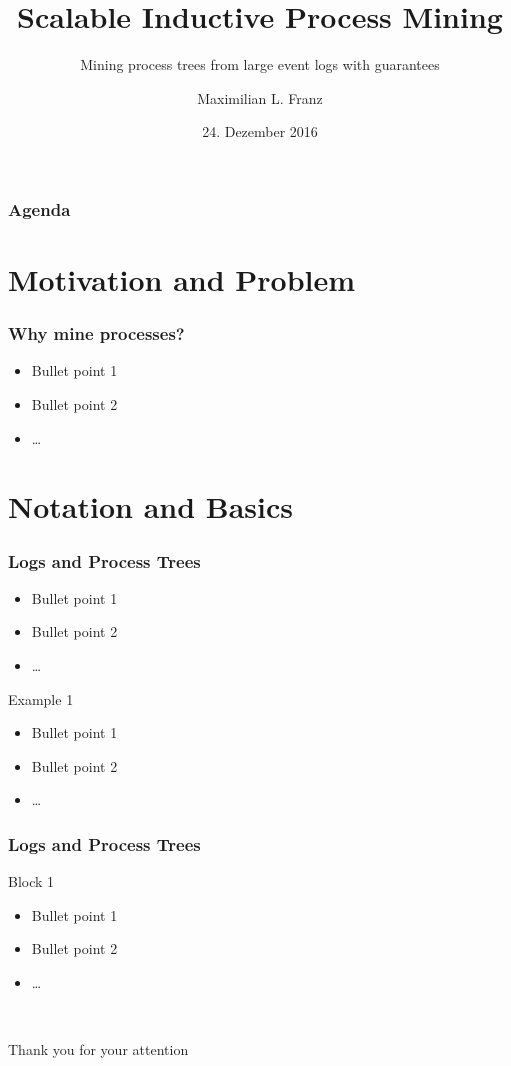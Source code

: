 \documentclass[18pt]{beamer}
\institute{Proseminar Anthropomatik: Von der Theorie zur Anwendung}
\title[Scalable Inductive Process Mining]{Scalable Inductive Process Mining}
\subtitle{Mining process trees from large event logs with guarantees}
\author{Maximilian L. Franz}
\date{24. Dezember 2016}
\begin{document}
\begin{frame}
    \titlepage
\end{frame}

\begin{frame}
    \frametitle{Agenda}
    \tableofcontents
\end{frame}

\section{Motivation and Problem} %
\label{sec:}
\begin{frame}
    \frametitle{Why mine processes?}    
    \begin{itemize}
	\item Bullet point 1
	\pause
	\item Bullet point 2
	\item \dots
\end{itemize}
\end{frame}


\section{Notation and Basics} %
\label{sec:notation_and_basics}
\begin{frame}
    \frametitle{Logs and Process Trees}    
    \begin{itemize}
	\item Bullet point 1
	\pause
	\item Bullet point 2
	\item \dots
\end{itemize}
\begin{exampleblock}{Example 1}
\begin{itemize}
\item Bullet point 1
\pause
\item Bullet point 2
\item \dots
\end{itemize}
\end{exampleblock}
\end{frame}

\begin{frame}
    \frametitle{Logs and Process Trees} 
\begin{block}{Block 1}
\begin{itemize}
\item Bullet point 1
\pause
\item Bullet point 2
\item \dots
\end{itemize}
\end{block}
\end{frame}


\begin{frame}{~}
	\begin{center}
		\huge{Thank you for your attention}
	\end{center}
\end{frame}
\end{document}
